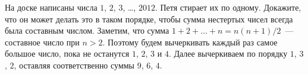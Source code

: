 \problem
На доске написаны числа $1$, $2$, $3$, \ldots, $2012$.
Петя стирает их по одному.
Докажите, что он может делать это в таком порядке, чтобы сумма нестертых чисел
всегда была составным числом.
\solution
Заметим, что сумма $1 + 2 + \ldots + n = n (n + 1) / 2$~--- составное число при
$n > 2$.
Поэтому будем вычеркивать каждый раз самое большое число, пока не останутся
$1$, $2$, $3$ и $4$.
Далее вычеркиваем по порядку $1$, $3$, $2$, оставляя соответственно суммы
$9$, $6$, $4$.
\endproblem
